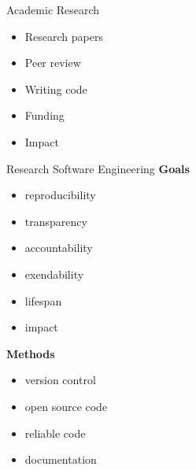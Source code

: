 \documentclass{beamer} %
\begin{document}
  \begin{frame}{Academic Research}
    \begin{itemize}
      \item Research papers
      \item Peer review
      \item Writing code
      \item Funding
      \item Impact
    \end{itemize}
    
  \end{frame}

  \begin{frame}{Research Software Engineering}
    \textbf{Goals}
    \begin{itemize}
      \item reproducibility
      \item transparency
      \item accountability
      \item exendability
      \item lifespan
      \item impact
    \end{itemize}

    \textbf{Methods}
    \begin{itemize}
      \item version control
      \item open source code
      \item reliable code
      \item documentation
    \end{itemize}
  \end{frame}
\end{document}

